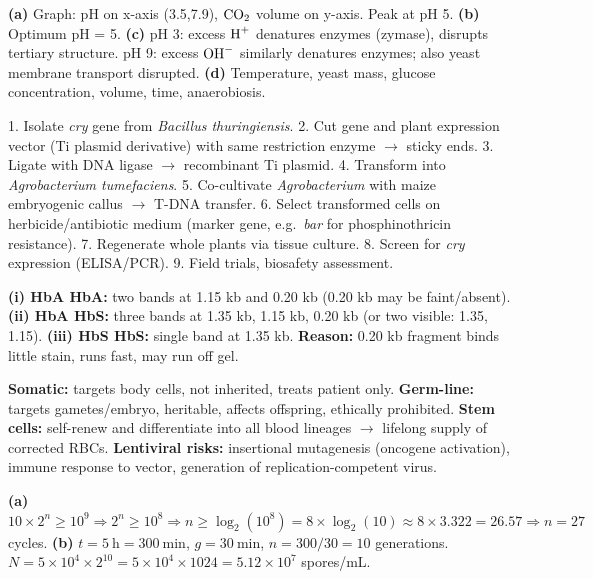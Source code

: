 \documentclass[11pt]{article}
\begin{document}
\begin{corrige}
\textbf{(a)} Graph: pH on x-axis (3.5,7.9), $\ce{CO2}$ volume on y-axis. Peak at pH 5. \textbf{(b)} Optimum pH = 5. \textbf{(c)} pH 3: excess $\ce{H+}$ denatures enzymes (zymase), disrupts tertiary structure. pH 9: excess $\ce{OH-}$ similarly denatures enzymes; also yeast membrane transport disrupted. \textbf{(d)} Temperature, yeast mass, glucose concentration, volume, time, anaerobiosis.
\end{corrige}

\begin{corrige}
1. Isolate \emph{cry} gene from \emph{Bacillus thuringiensis}. 2. Cut gene and plant expression vector (Ti plasmid derivative) with same restriction enzyme $\rightarrow$ sticky ends. 3. Ligate with DNA ligase $\rightarrow$ recombinant Ti plasmid. 4. Transform into \emph{Agrobacterium tumefaciens}. 5. Co-cultivate \emph{Agrobacterium} with maize embryogenic callus $\rightarrow$ T-DNA transfer. 6. Select transformed cells on herbicide/antibiotic medium (marker gene, e.g.\ \emph{bar} for phosphinothricin resistance). 7. Regenerate whole plants via tissue culture. 8. Screen for \emph{cry} expression (ELISA/PCR). 9. Field trials, biosafety assessment.
\end{corrige}

\begin{corrige}
\textbf{(i) HbA HbA:} two bands at 1.15 kb and 0.20 kb (0.20 kb may be faint/absent). \textbf{(ii) HbA HbS:} three bands at 1.35 kb, 1.15 kb, 0.20 kb (or two visible: 1.35, 1.15). \textbf{(iii) HbS HbS:} single band at 1.35 kb. \textbf{Reason:} 0.20 kb fragment binds little stain, runs fast, may run off gel.
\end{corrige}

\begin{corrige}
\textbf{Somatic:} targets body cells, not inherited, treats patient only. \textbf{Germ-line:} targets gametes/embryo, heritable, affects offspring, ethically prohibited. \textbf{Stem cells:} self-renew and differentiate into all blood lineages $\rightarrow$ lifelong supply of corrected RBCs. \textbf{Lentiviral risks:} insertional mutagenesis (oncogene activation), immune response to vector, generation of replication-competent virus.
\end{corrige}

\begin{corrige}
\textbf{(a)} $10 \times 2^n \ge 10^9 \Rightarrow 2^n \ge 10^8 \Rightarrow n \ge \log_2(10^8) = 8 \times \log_2(10) \approx 8 \times 3.322 = 26.57 \Rightarrow n = 27$ cycles. \textbf{(b)} $t = 5\ \mathrm{h} = 300\ \mathrm{min}$, $g = 30\ \mathrm{min}$, $n = 300/30 = 10$ generations. $N = 5 \times 10^4 \times 2^{10} = 5 \times 10^4 \times 1024 = 5.12 \times 10^7$ spores/mL.
\end{corrige}
\end{document}
